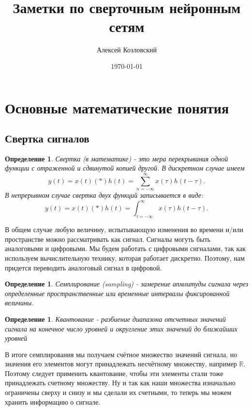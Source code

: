 \documentclass[a4paper,12pt]{article}
\author{Алексей Козловский}
\title{Заметки по сверточным нейронным сетям}
\date{\today}
\newtheorem{defn}[theorem]{Определение}
\begin{document}
    

\maketitle




\section{Основные математические понятия}%
\label{sec:основные_математические_понятия}

\subsection{Свертка сигналов}%
\label{sub:свертка_сигналов}

\begin{defn}
    Свертка (в математике) - это мера перекрывания одной функции с отраженной и сдвинутой копией другой. В дискретном случае имеем 
     \[
         y(t) = x(t) (*) h(t) = \sum_{n=-\infty}^{\infty} x(\tau)h(t - \tau)
    .\] 
    В непрерывном случае свертка двух функций записывается в виде:
    \[
        y(t) = x(t) (*) h(t) = \int_{\tau = -\infty}^{\infty } x(\tau)h(t - \tau)
    .\] 
\end{defn}
В общем случае любую величину, испытывающую изменения во времени и/или пространстве
можно рассматривать как сигнал. Сигналы могуть быть аналоговыми и цифровыми.
Мы будем работать с цифровыми сигналами, так как используем вычислительную технику,
которая работает дискретно. Поэтому, нам придется переводить аналоговый сигнал
в цифровой.
\begin{defn}
    Семплирование (sampling) - замерение апмлитуды сигнала через определенные 
    пространственные или временные интервалы фиксированной величины.
\end{defn}
\begin{defn}
   Квантование - разбиение диапазона отсчетных значений сигнала на конечное число
   уровней и округление этих значений до ближайших уровней
\end{defn}

В итоге семплирования мы получаем счётное множество значений сигнала, но значения
его элементов могут принадлежать несчётному множеству, например $\mathbb{R}$. 
Поэтому следует применить квантование, чтобы эти элементы стали тоже принадлежать
счетному множеству. Ну и так как наши множества изначально ограничены сверху и снизу
и мы сделали их счетными, то теперь мы можем хранить информацию о сигнале.
\end{document}
